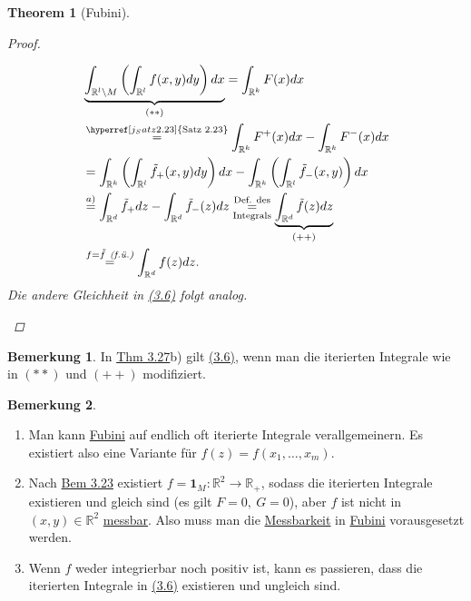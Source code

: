 \documentclass[a4paper]{scrreprt}
\newcommand{\doubleOne}{\textbf{1}}
\newcommand{\R}{\mathbb{R}}
\newcommand{\jlabel}[1]{\label{j_#1}}
\newcommand{\jshortlink}[1]{\jhyperref{#1}{\text{#1}}}
\newcommand{\jhyperref}[2]{\hyperref[j_#1]{#2}}
\newcommand{\jlink}[1]{\jhyperref{#1}{#1}}
\newcommand{\fu}{\text{\textit{(f.ü.)}}}
\newcommand{\jabb}[3]{ #1: #2 \rightarrow #3 }
\newcommand{\jspacesmall}{\vspace{4pt}}
\theoremstyle{plain}
\newtheorem{thm}{Theorem}[chapter]
\theoremstyle{definition}
\newtheorem{bem}[thm]{Bemerkung}
\newtheorem*{bem*}{Bemerkung}
\begin{document}
{{{{\begin{thm}[Fubini]
\begin{proof}
\begin{enumerate}
\begin{displaymath}
                    \begin{split}
                        &\underbrace{\int_{\R^l\backslash M} \left(\int_{\R^l} f(x,y)dy \right)dx}_{(**)} = \int_{\R^k} F(x) dx\\
                        &\overset{\jshortlink{Satz 2.23}}{=} \int_{\R^k} F^+(x) dx - \int_{\R^k} F^-(x)dx\\
                        &= \int_{\R^k} \left(\int_{\R^l} \tilde{f}_+(x,y)dy \right)dx - \int_{\R^k}\left(\int_{\R^l} \tilde{f}_-(x,y) \right)dx\\
                        &\overset{a)}{=} \int_{\R^d} \tilde{f}_+dz - \int_{\R^d} \tilde{f}_-(z)dz \underset{\text{Integrals}}{\overset{\text{Def. des}}{=}} \underbrace{\int_{\R^d} \tilde{f}(z)dz}_{(++)}\\
                        &\overset{f=\tilde{f}\ \fu}{=} \int_{\R^d}f(z)dz.
                    \end{split}
                \end{displaymath}
                Die andere Gleichheit in \jlink{(3.6)} folgt analog.
        \end{enumerate}
    \end{proof}
\end{thm}

\begin{bem*}
    In \jlink{Thm 3.27}b) gilt \jlink{(3.6)}, wenn man die iterierten Integrale wie in $(**)$ und $(++)$ modifiziert.
\end{bem*}

\jlabel{Bem 3.28}
\begin{bem}
    \begin{enumerate}
        \item Man kann \jlink{Fubini} auf endlich oft iterierte Integrale verallgemeinern. Es existiert also eine Variante für $f(z) = f(x_1, \dots, x_m)$.
        \item 
            Nach \jlink{Bem 3.23} existiert $\jabb{f = \doubleOne_M}{\R^2}{\R_+}$, sodass die iterierten Integrale existieren und gleich sind (es gilt $F=0,\ G=0$), aber $f$ ist nicht in $(x,y)\in\R^2$ \jlink{messbar}. Also muss man die  \jhyperref{messbar}{Messbarkeit} in \jlink{Fubini} vorausgesetzt werden.
        \item 
            Wenn $f$ weder integrierbar noch positiv ist, kann es passieren, dass die iterierten Integrale in \jlink{(3.6)} existieren und ungleich sind.
        
            \jspacesmall
            

\end{enumerate}
\end{bem}}}}}
\end{document}
